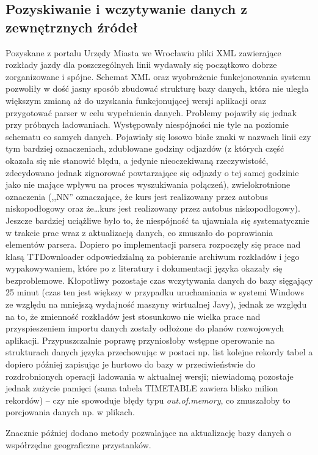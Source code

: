 \documentclass[a4paper,12pt]{article}
\begin{document}
  \subsection{Pozyskiwanie i wczytywanie danych z zewnętrznych źródeł }
  Pozyskane z portalu Urzędy Miasta we Wrocławiu pliki XML zawierające rozkłady
  jazdy dla poszczególnych linii wydawały się początkowo dobrze zorganizowane i
  spójne. Schemat XML oraz wyobrażenie funkcjonowania systemu pozwoliły w dość
  jasny sposób zbudować strukturę bazy danych, która nie uległa większym zmianą
  aż do uzyskania funkcjonującej wersji aplikacji oraz przygotować parser w
  celu wypełnienia danych. Problemy pojawiły się jednak przy próbnych
  ładowaniach. Występowały niespójności nie tyle na poziomie schematu co samych
  danych. Pojawiały się losowo białe znaki w nazwach linii czy tym bardziej
  oznaczeniach, zdublowane godziny odjazdów (z których część okazała się nie
  stanowić błędu, a jedynie nieoczekiwaną rzeczywistość, zdecydowano jednak
  zignorować powtarzające się odjazdy o tej samej godzinie jako nie mające
  wpływu na proces wyszukiwania połączeń), zwielokrotnione oznaczenia (,,NN''
  oznaczające, że kurs jest realizowany przez autobus niskopodłogowy oraz
  że\ldots kurs jest realizowany przez autobus niskopodłogowy). Jeszcze
  bardziej uciążliwe było to, że niespójność ta ujawniała się systematycznie w
  trakcie prac wraz z aktualizacją danych, co zmuszało do poprawiania
  elementów parsera. 
  Dopiero po implementacji parsera rozpoczęły się prace nad  klasą
  TTDownloader odpowiedzialną za pobieranie archiwum rozkładów i jego
  wypakowywaniem, które po z literatury i dokumentacji języka okazały się
  bezproblemowe.
  Kłopotliwy pozostaje czas wczytywania danych do bazy sięgający 25 minut
  (czas ten jest większy w przypadku uruchamiania w systemi Windows ze
  względu na mniejszą wydajność maszyny wirtualnej Javy), jednak ze względu na
  to, że zmienność rozkładów jest stosunkowo nie wielka prace nad
  przyspieszeniem importu danych zostały odłożone do planów rozwojowych
  aplikacji. Przypuszczalnie poprawę przyniosłoby wstępne operowanie na
  strukturach danych języka przechowując w postaci np. list kolejne rekordy
  tabel a dopiero później zapisując je hurtowo do bazy w przeciwieństwie do
  rozdrobnionych operacji ładowania w aktualnej wersji; niewiadomą pozostaje
  jednak zużycie pamięci (sama tabela TIMETABLE zawiera blisko milion
  rekordów) -- czy nie spowoduje błędy typu \emph{out.of.memory}, co zmuszałoby
  to porcjowania danych np. w plikach.
  
  Znacznie później dodano metody pozwalające na aktualizację bazy danych o
  współrzędne geograficzne przystanków. 
  
\end{document}
